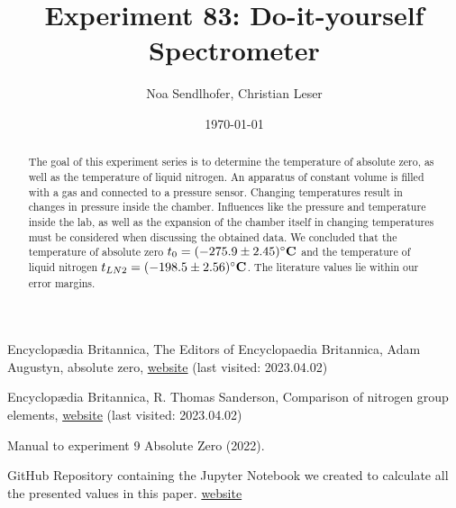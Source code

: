 \documentclass[12pt,a4paper]{article}
\title{Experiment 83: Do-it-yourself Spectrometer}
\author{Noa Sendlhofer, Christian Leser}
\date{\today}
\begin{document}
\maketitle

\begin{abstract}
    The goal of this experiment series is to determine the temperature of absolute zero, 
    as well as the temperature of liquid nitrogen. An apparatus of constant volume is filled with a gas
    and connected to a pressure sensor. Changing temperatures result in changes in pressure inside the chamber.
    Influences like the pressure and temperature inside the lab, as well as the expansion of the chamber itself
    in changing temperatures must be considered when discussing the obtained data. We concluded that the temperature
    of absolute zero $t_0 = (-275.9 \pm 2.45)\si{\bf\celsius}$ and the temperature of liquid nitrogen $t_{LN2} = (-198.5 \pm 2.56)\si{\bf\celsius}$.
    The literature values lie within our error margins.

\end{abstract}

\tableofcontents









\begin{thebibliography}{99}

Encyclop\ae dia Britannica, The Editors of Encyclopaedia Britannica, Adam Augustyn, absolute zero, \href{https://www.britannica.com/science/absolute-zero}{website} (last visited: 2023.04.02)

Encyclop\ae dia Britannica, R. Thomas Sanderson, Comparison of nitrogen group elements, \href{https://www.britannica.com/science/nitrogen-group-element/Comparison-of-nitrogen-group-elements}{website} (last visited: 2023.04.02)

Manual to experiment 9 Absolute Zero (2022).

GitHub Repository containing the Jupyter Notebook we created to calculate all the presented values in this paper. \href{https://github.com/Noothless/Physik-Absolute-Zero}{website}

\end{thebibliography}
\end{document}
